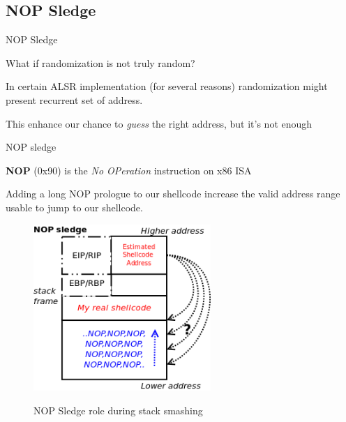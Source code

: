 \subsection{NOP Sledge}
\begin{frame}{NOP Sledge}
	
	\begin{block}{What if randomization is not truly random?}
	\begin{list}{-}{}
	\item In certain ALSR implementation (for several reasons) randomization 
		might present recurrent set of address.
	\item This enhance our chance to \emph{guess} the right address, but it's not enough
	\end{list}
	\end{block}
	
	\begin{block}{NOP sledge}
	\begin{list}{-}{}
		\item {\bf NOP} (0x90) is the \emph{No OPeration} instruction on x86 ISA
		\item Adding a long NOP prologue to our shellcode increase the valid address range usable to jump to our shellcode.
	\end{list}
	\end{block}

	\framebreak
	
	\begin{figure}
        \includegraphics[width=0.6\textwidth]{imgs/nop-sledge.png}
        \label{fig:nop-sledge}
        \caption{NOP Sledge role during stack smashing}
    \end{figure}	
	
\end{frame}

